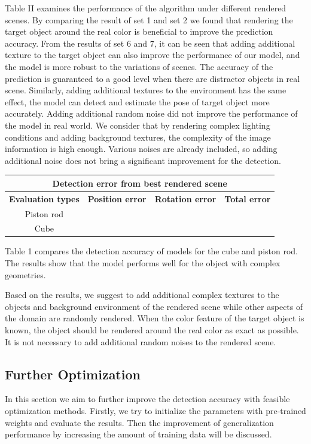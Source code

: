 Table II examines the performance of the algorithm under different rendered scenes. By comparing the result of set 1 and set 2 we found that rendering the target object around the real color is beneficial to improve the prediction accuracy. From the results of set 6 and 7, it can be seen that adding additional texture to the target object can also improve the performance of our model, and the model is more robust to the variations of scenes. The accuracy of the prediction is guaranteed to a good level when there are distractor objects in real scene. Similarly, adding additional textures to the environment has the same effect, the model can detect and estimate the pose of target object more accurately. Adding additional random noise did not improve the performance of the model in real world. We consider that by rendering complex lighting conditions and adding background textures, the complexity of the image information is high enough. Various noises are already included, so adding additional noise does not bring a significant improvement for the detection.
 
\begin{table}[]
	\begin{tabular}{|c|c|c|c|}
		\hline
		\multicolumn{4}{|c|}{\textbf{Detection error from best rendered scene}} \\ \hline
		\textbf{Evaluation types} & \textbf{Position error} & \textbf{Rotation error} & \textbf{Total error} \\ \hline
		Piston rod &  &  &  \\ \hline
		Cube &  &  &  \\ \hline
	\end{tabular}
\end{table}

Table 1 compares the detection accuracy of models for the cube and piston rod. The results show that the model performs well for the object with complex geometries.

Based on the results, we suggest to add additional complex textures to the objects and background environment of the rendered scene while other aspects of the domain are randomly rendered.  When the color feature of the target object is known, the object should be rendered around the real color as exact as possible. It is not necessary to add additional random noises to the rendered scene.

\subsection{Further Optimization}
In this section we aim to further improve the detection accuracy with feasible optimization methods. Firstly, we try to initialize the parameters with pre-trained weights and evaluate the results. Then the  improvement of generalization performance by increasing the amount of training data will be discussed.

